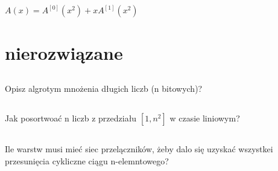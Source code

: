 \documentclass[svgnames]{report}
\begin{document}
$A(x) = A^{[0]}(x^2)+xA^{[1]}(x^2)$\\

\chapter{nierozwiązane}
\section{}
\begin{framed}
Opisz algrotym mnożenia długich liczb (n bitowych)?
\end{framed}

\section{} 
\begin{framed}
Jak posortwoać n liczb z przedziału $[1, n^2]$ w  czasie liniowym?
\end{framed}

\section{}
\begin{framed}
Ile warstw musi mieć siec przelączników, żeby dalo się uzyskać wszystkei przesunięcia cykliczne ciągu n-elemntowego?
\end{framed}

\begin{thebibliography}{99}
\end{thebibliography}
\end{document}

